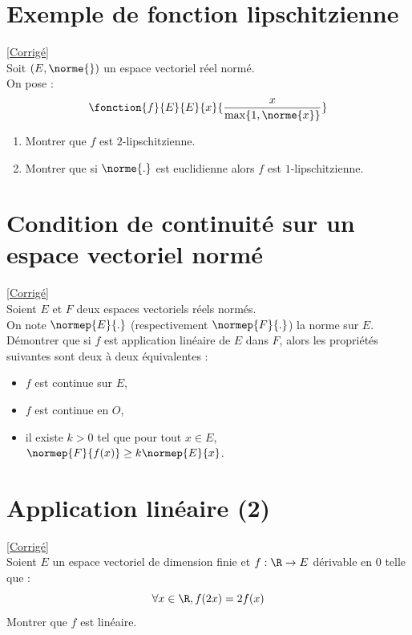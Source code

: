 \documentclass{book}
\begin{document}
\section{Exemple de fonction lipschitzienne}
\label{Exemple de fonction lipschitzienne}
\textcolor{blue}{\hyperref[sec:exemple-de-fonctions-lipschitzienne]{[Corrigé]}}\\
Soit $(E,\norme{})$ un espace vectoriel réel normé.\\
On pose :\[\fonction{f}{E}{E}{x}{\frac{x}{\max\{1,\norme{x}\}}}\]
\begin{enumerate}
	\item Montrer que $f$ est $2$-lipschitzienne.
	\item Montrer que si $\norme{.}$ est euclidienne alors $f$ est $1$-lipschitzienne.
\end{enumerate}

\section{Condition de continuité sur un espace vectoriel normé}
\label{Condition de continuité sur un espace vecoriel normé}
\textcolor{blue}{\hyperref[sec:condition-de-continuite-sur-un-espace-vectoriel-norme]{[Corrigé]}}\\
Soient $E$ et $F$ deux espaces vectoriels réels normés.\\
On note $\normep{E}{.}$ (respectivement $\normep{F}{.}$) la norme sur $E$.\\
Démontrer que si $f$ est application linéaire de $E$ dans $F$, alors les propriétés suivantes sont deux à deux équivalentes :\\
\begin{itemize}
	\item $f$ est continue sur $E$,
	\item $f$ est continue en $O$,
	\item il existe $k>0$ tel que pour tout $x\in E$, $\normep{F}{f(x)}\geq k\normep{E}{x}$.
\end{itemize}

\section{Application linéaire (2)}
\label{Application linéaire 2}
\textcolor{blue}{\hyperref[sec:application-lineaire-2]{[Corrigé]}}\\
Soient $E$ un espace vectoriel de dimension finie et $f:\R\to E$ dérivable en $0$ telle que :\[\forall x\in\R, f(2x)=2f(x)\]
Montrer que $f$ est linéaire.
\end{document}
